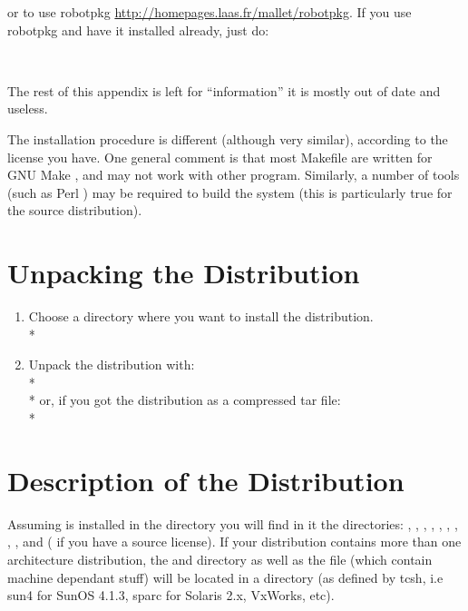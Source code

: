 or to use robotpkg \url{http://homepages.laas.fr/mallet/robotpkg}. If you
use robotpkg and have it installed already, just do:

\noindent{}\\

\vspace{5mm}

The rest of this appendix is left for ``information'' it is mostly out of
date and useless.

The installation procedure is different (although very similar), according to
the license you have. One general comment is that most Makefile are written for
GNU Make \cite{GNU-make-manual}, and may not work with other 
program. Similarly, a number of tools (such as Perl \cite{perl-manual}) may be
required to build the system (this is particularly true for the source
distribution).



\section{Unpacking the Distribution}

\begin{enumerate}

\item Choose a directory where you want to install the distribution. \\*

\item Unpack the distribution with: \\*
 \\*
or, if you got the distribution as a compressed tar file: \\*

\end{enumerate}

\section{Description of the Distribution}

Assuming \COPRSDE{} is installed in the directory  you
will find in it the directories: , , ,
, , , , ,
,  and  ( if you have a
source license).  If your distribution contains more than one architecture
distribution, the  and  directory as well as the
 file (which contain machine dependant stuff) will be located
in a  directory (as defined by tcsh, i.e sun4 for SunOS 4.1.3,
sparc for Solaris 2.x, VxWorks, etc).


